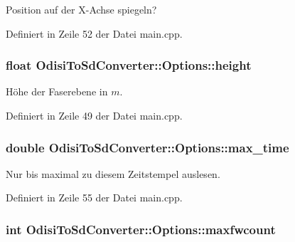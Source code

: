 Position auf der X-\/\-Achse spiegeln? 



Definiert in Zeile 52 der Datei main.\-cpp.

\hypertarget{structOdisiToSdConverter_1_1Options_a9e9609b45b425d128550508772ad69f6}{
\subsubsection[{height}]{\setlength{\rightskip}{0pt plus 5cm}float Odisi\-To\-Sd\-Converter\-::\-Options\-::height}}\label{structOdisiToSdConverter_1_1Options_a9e9609b45b425d128550508772ad69f6}


Höhe der Faserebene in $m$. 



Definiert in Zeile 49 der Datei main.\-cpp.

\hypertarget{structOdisiToSdConverter_1_1Options_afb526c278f5e4273379c0e6345ce01c0}{
\subsubsection[{max\-\_\-time}]{\setlength{\rightskip}{0pt plus 5cm}double Odisi\-To\-Sd\-Converter\-::\-Options\-::max\-\_\-time}}\label{structOdisiToSdConverter_1_1Options_afb526c278f5e4273379c0e6345ce01c0}


Nur bis maximal zu diesem Zeitstempel auslesen. 



Definiert in Zeile 55 der Datei main.\-cpp.

\hypertarget{structOdisiToSdConverter_1_1Options_aca66edaa34e64581ddb68bca902634df}{
\subsubsection[{maxfwcount}]{\setlength{\rightskip}{0pt plus 5cm}int Odisi\-To\-Sd\-Converter\-::\-Options\-::maxfwcount}}\label{structOdisiToSdConverter_1_1Options_aca66edaa34e64581ddb68bca902634df}


